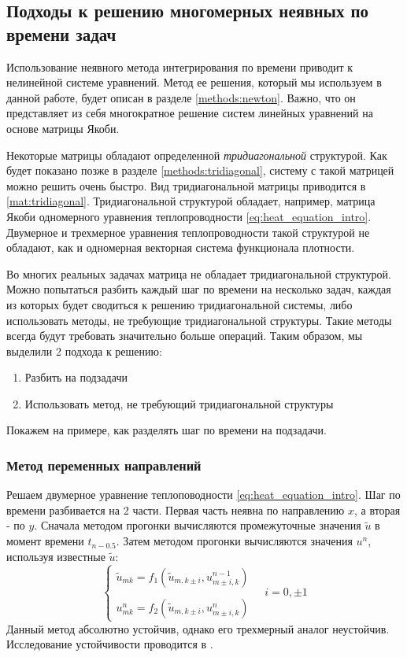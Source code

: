 \subsection{Подходы к решению многомерных неявных по времени задач}
Использование неявного метода интегрирования по времени приводит к нелинейной системе уравнений. Метод ее решения, который мы используем в данной работе, будет описан в разделе \ref{methods:newton}. Важно, что он представляет из себя многократное решение систем линейных уравнений на основе матрицы Якоби. 
\par 
Некоторые матрицы обладают определенной  \textit{тридиагональной} структурой. Как будет показано позже в разделе \ref{methods:tridiagonal}, систему с такой матрицей можно решить очень быстро. Вид тридиагональной матрицы приводится в \eqref{mat:tridiagonal}.
Тридиагональной структурой обладает, например, матрица Якоби одномерного уравнения теплопроводности \eqref{eq:heat_equation_intro}. Двумерное и трехмерное уравнения теплопроводности такой структурой не обладают, как и одномерная векторная система функционала плотности. 
\par
Во многих реальных задачах матрица не обладает тридиагональной структурой. Можно попытаться разбить каждый шаг по времени на несколько задач, каждая из которых будет сводиться к решению тридиагональной системы, либо использовать методы, не требующие тридиагональной структуры. Такие методы всегда будут требовать значительно больше операций. Таким образом, мы выделили 2 подхода к решению: 
\begin{enumerate}
\item Разбить на подзадачи
\item Использовать метод, не требующий тридиагональной структуры
\end{enumerate}
Покажем на примере, как разделять шаг по времени на подзадачи.
\subsubsection*{Метод переменных направлений \label{methods:alternate_directions}}
Решаем двумерное уравнение теплоповодности \eqref{eq:heat_equation_intro}. Шаг по времени разбивается на 2 части. Первая часть неявна по направлению $x$, а вторая - по $y$. Сначала методом прогонки вычисляются промежуточные значения $\tilde u$ в момент времени $t_{n - 0.5}$. Затем методом прогонки вычисляются значения $u^n$, используя известные $\tilde u$:
\begin{equation}
\begin{cases}
\tilde u_{mk} = f_1(\tilde u_{m, k \pm i}, u^{n - 1}_{m \pm i, k} ) 
\\ \\
u^{n}_{mk} = f_2(\tilde u_{m, k \pm i}, u^{n}_{m \pm i, k} )
\end{cases}
\quad i = 0, \pm 1
\end{equation}
Данный метод абсолютно устойчив, однако его трехмерный аналог неустойчив. Исследование устойчивости проводится в \cite{Sikovskii}.

